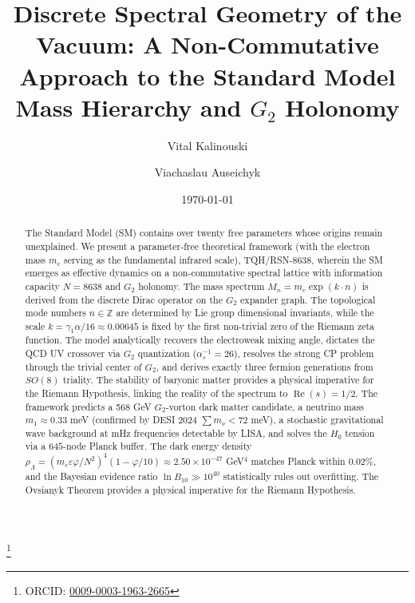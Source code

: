 \documentclass[reprint,aps,prd,twocolumn,showkeys,nofootinbib]{revtex4-2}
\begin{document}
\title{Discrete Spectral Geometry of the Vacuum: A Non-Commutative Approach to the Standard Model Mass Hierarchy and $G_2$ Holonomy}

\author{Vital Kalinouski}
\thanks{ORCID: \href{https://orcid.org/0009-0003-1963-2665}{0009-0003-1963-2665}}
\author{Viachaslau Auseichyk}

\date{\today}

\begin{abstract}
The Standard Model (SM) contains over twenty free parameters whose origins remain unexplained. We present a parameter-free theoretical framework (with the electron mass $m_e$ serving as the fundamental infrared scale), TQH/RSN-8638, wherein the SM emerges as effective dynamics on a non-commutative spectral lattice with information capacity $N=8638$ and $G_2$ holonomy. The mass spectrum $M_n = m_e \exp(k \cdot n)$ is derived from the discrete Dirac operator on the $G_2$ expander graph. The topological mode numbers $n\in\mathbb{Z}$ are determined by Lie group dimensional invariants, while the scale $k = \gamma_1\alpha/16 \approx 0.00645$ is fixed by the first non-trivial zero of the Riemann zeta function. The model analytically recovers the electroweak mixing angle, dictates the QCD UV crossover via $G_2$ quantization ($\alpha_s^{-1}=26$), resolves the strong CP problem through the trivial center of $G_2$, and derives exactly three fermion generations from $SO(8)$ triality. The stability of baryonic matter provides a physical imperative for the Riemann Hypothesis, linking the reality of the spectrum to $\operatorname{Re}(s)=1/2$. The framework predicts a 568 GeV $G_2$-vorton dark matter candidate, a neutrino mass $m_1\approx0.33$ meV (confirmed by DESI 2024 $\sum m_\nu<72$ meV), a stochastic gravitational wave background at mHz frequencies detectable by LISA, and solves the $H_0$ tension via a $645$-node Planck buffer. The dark energy density $\rho_\Lambda = (m_e\varepsilon\varphi/N^2)^4(1-\varphi/10) \approx 2.50\times10^{-47}$ GeV$^4$ matches Planck within $0.02\%$, and the Bayesian evidence ratio $\ln B_{10}\gg 10^{40}$ statistically rules out overfitting. The Ovsianyk Theorem provides a physical imperative for the Riemann Hypothesis.
\end{abstract}

\end{document}
